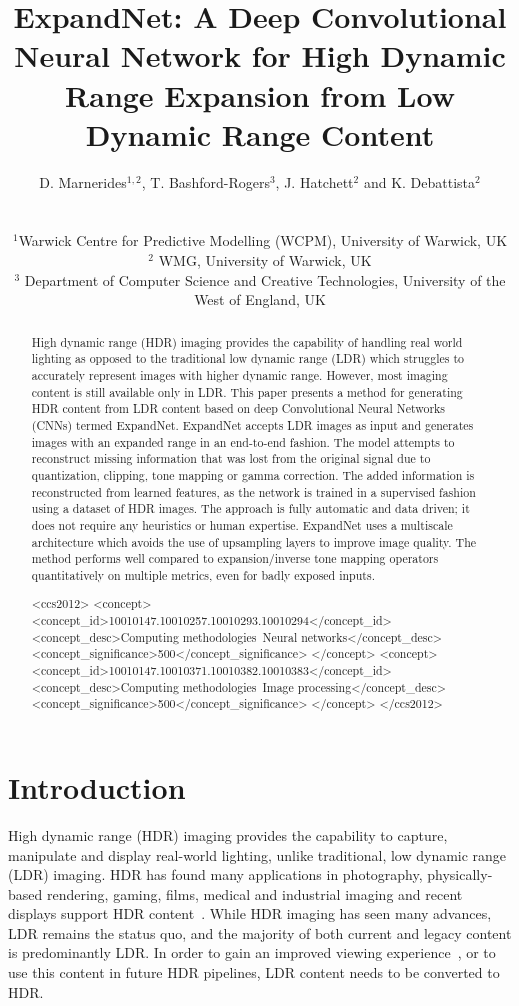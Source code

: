 \documentclass{egpubl}
\title[ExpandNet]{ExpandNet: A Deep Convolutional Neural Network for High Dynamic Range Expansion from Low Dynamic Range Content}
\author[Marnerides et al.]
{\parbox{\textwidth}{\centering D. Marnerides$^{1,2}$,
T. Bashford-Rogers$^{3}$,
J. Hatchett$^{2}$
and K. Debattista$^{2}$
        }
        \\
{\parbox{\textwidth}{\centering $^1$Warwick Centre for Predictive Modelling (WCPM), University of Warwick, UK\\
         $^2$ WMG, University of Warwick, UK\\
         $^3$ Department of Computer Science and Creative Technologies, University of the West of England, UK
       }
}
}
\begin{document}
\maketitle
\begin{abstract}
    High dynamic range (HDR) imaging provides the capability of handling real world
    lighting as opposed to the traditional low dynamic range (LDR) which struggles
    to accurately represent images with higher dynamic range. However, most imaging
    content is still available only in LDR. This paper presents a method for
    generating HDR content from LDR content based on deep Convolutional Neural
    Networks (CNNs) termed ExpandNet. ExpandNet accepts LDR images as input and
    generates images with an expanded range in an end-to-end fashion. The model
    attempts to reconstruct missing information that was lost from the original
    signal due to quantization, clipping, tone mapping or gamma correction. The
    added information is reconstructed from learned features, as the network is
    trained in a supervised fashion using a dataset of HDR images. The approach is
    fully automatic and data driven; it does not require any heuristics or human
    expertise. ExpandNet uses a multiscale architecture which avoids the use of
    upsampling layers to improve image quality. The method performs well compared to
    expansion/inverse tone mapping operators quantitatively on multiple
    metrics, even for badly exposed inputs.


\begin{CCSXML}
<ccs2012>
<concept>
<concept_id>10010147.10010257.10010293.10010294</concept_id>
<concept_desc>Computing methodologies~Neural networks</concept_desc>
<concept_significance>500</concept_significance>
</concept>
<concept>
<concept_id>10010147.10010371.10010382.10010383</concept_id>
<concept_desc>Computing methodologies~Image processing</concept_desc>
<concept_significance>500</concept_significance>
</concept>
</ccs2012>
\end{CCSXML}


\printccsdesc
\end{abstract}


\section{\textbf{Introduction}}

High dynamic range (HDR) imaging provides the capability to capture, manipulate and display real-world lighting, unlike traditional, low dynamic
range (LDR) imaging. HDR has found many applications in photography, physically-based rendering, gaming, films, medical and industrial imaging and
recent displays support HDR content~\cite{eetzen2004hdr, marchessoux2016medicalhdr}. While HDR imaging has seen many advances, LDR remains the status
quo, and the majority of both current and legacy content is predominantly LDR. In order to gain an improved viewing experience~\cite{akyuz06}, or to
use this content in future HDR pipelines, LDR content needs to be converted to HDR.
\end{document}

